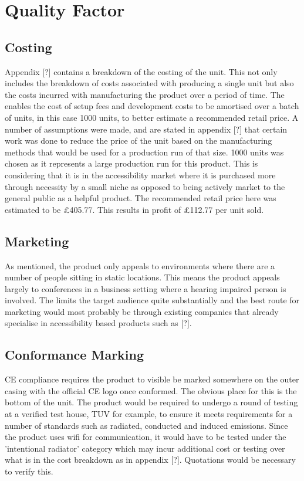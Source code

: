 \documentclass[a4paper]{article}
\begin{document}
\section{Quality Factor}

\subsection{Costing}
Appendix [?] contains a breakdown of the costing of the unit. This not only
includes the breakdown of costs associated with producing a single unit but also
the costs incurred with manufacturing the product over a period of time. The
enables the cost of setup fees and development costs to be amortised over a
batch of units, in this case 1000 units, to better estimate a recommended retail
price. A number of assumptions were made, and are stated in appendix [?] that
certain work was done to reduce the price of the unit based on the manufacturing
methods that would be used for a production run of that size.  1000 units was
chosen as it represents a large production run for this product. This is
considering that it is in the accessibility market where it is purchased more
through necessity by a small niche as opposed to being actively market to the
general public as a helpful product.  The recommended retail price here was
estimated to be £405.77. This results in profit of £112.77 per unit sold.

\subsection{Marketing}
As mentioned, the product only appeals to environments where there are a number
of people sitting in static locations. This means the product appeals largely to
conferences in a business setting where a hearing impaired person is involved.
The limits the target audience quite substantially and the best route for
marketing would most probably be through existing companies that already
specialise in accessibility based products such as [?].

\subsection{Conformance Marking}
CE compliance requires the product to visible be marked somewhere on the outer
casing with the official CE logo once conformed. The obvious place for this is
the bottom of the unit. The product would be required to undergo a round of
testing at a verified test house, TUV for example, to ensure it meets
requirements for a number of standards such as radiated, conducted and induced
emissions. Since the product uses wifi for communication, it would have to be
tested under the 'intentional radiator' category which may incur additional cost
or testing over what is in the cost breakdown as in appendix [?]. Quotations
would be necessary to verify this.
\end{document}
